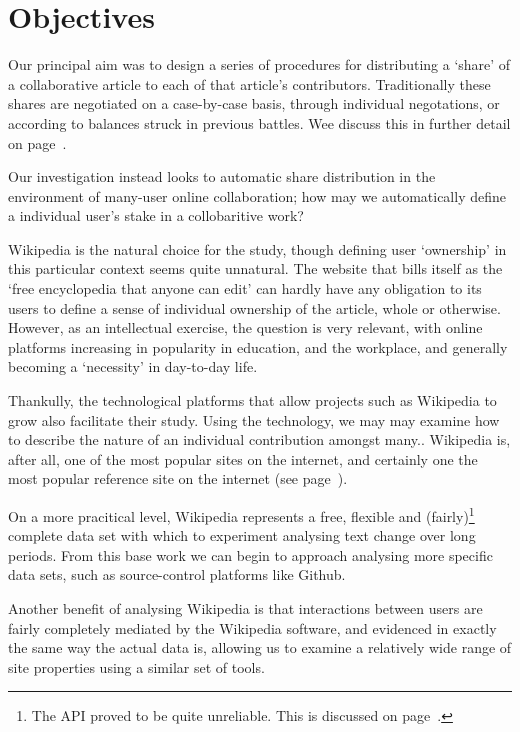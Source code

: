 \section{Objectives}
Our principal aim was to design a series of procedures for
distributing a `share' of a collaborative article to each of that
article's contributors. Traditionally these shares are negotiated on a
case-by-case basis, through individual negotations, or according to
balances struck in previous battles. Wee discuss this in further
detail on page~\pageref{sec:copyright}.

Our investigation instead looks to automatic share distribution in the
environment of many-user online collaboration; how may we
automatically define a individual user's stake in a collobaritive
work?

Wikipedia is the natural choice for the study, though defining user
`ownership' in this particular context seems quite unnatural. The
website that bills itself as the `free encyclopedia that anyone can
edit' can hardly have any obligation to its users to define a sense of
individual ownership of the article, whole or
otherwise.\cite{wiki-copyr} However, as an intellectual exercise, the
question is very relevant, with online platforms increasing in
popularity in education,\cite{wiki-collab} and the
workplace,\cite{workplace-future} and generally becoming a `necessity'
in day-to-day life.\cite{alsurvey}

Thankully, the technological platforms that allow projects such as
Wikipedia to grow also facilitate their study. Using the technology,
we may may examine how to describe the nature of an individual
contribution amongst many.. Wikipedia is, after all, one of the most
popular sites on the internet, and certainly one the most popular
reference site on the internet (see page~\pageref{sec:popularity}).

On a more pracitical level, Wikipedia represents a free, flexible and
(fairly)\footnote{The API proved to be quite unreliable. This is
  discussed on page~\pageref{sec:wiki-api}.} complete data set with which to experiment analysing text
change over long periods. From this base work we can begin to approach
analysing more specific data sets, such as source-control platforms
like Github.

Another benefit of analysing Wikipedia is that interactions between
users are fairly completely mediated by the Wikipedia software, and
evidenced in exactly the same way the actual data is, allowing us to
examine a relatively wide range of site properties using a similar set
of tools.

